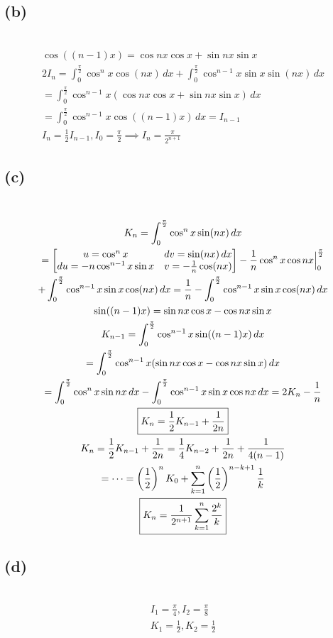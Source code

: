 \documentclass[12pt]{article}
\newcommand*{\paren}[1]{\ensuremath\left(#1\right)}
\newcommand{\subproblem}[1]{\subsection{(#1)} \,}
\begin{document}
\subproblem{b}
\begin{gather*}
    \cos ((n-1)x)=\cos nx \cos x +\sin nx\sin x\\
    2I_n=\int_0^{\frac{\pi}{2}} \cos^n x\cos (nx)\, dx + \int_0^\frac{\pi}{2} \cos ^{n-1}x\sin x \sin (nx)\, dx\\
    = \int_0^\frac{\pi}{2} \cos^{n-1}x(\cos nx \cos x +\sin nx\sin x)\, dx\\
    =\int_0^\frac{\pi}{2} \cos^{n-1}x\cos ((n-1)x)\, dx = I_{n-1}\\
    I_n = \frac{1}{2}I_{n-1}, I_0 = \frac{\pi}{2} \implies \boxed{I_n = \frac{\pi}{2^{n+1}}}
\end{gather*}

\subproblem{c}
\begin{gather*}
    K_n = \int_0^{\frac{\pi}{2}} \cos^n x \sin (nx)\, dx\\
    =\begin{bmatrix}
        u=\cos^n x & dv=\sin (nx)\, dx\\
        du=-n\cos^{n-1}x\sin x  & v=-\frac{1}{n}\cos (nx)
    \end{bmatrix} -\frac{1}{n}\cos^n x\cos nx\Big|^\frac{\pi}{2}_0 \\
    + \int_0^\frac{\pi}{2} \cos ^{n-1}x\sin x \cos (nx)\, dx = \frac{1}{n} - \int_0^\frac{\pi}{2} \cos ^{n-1}x\sin x \cos (nx)\, dx\\
    \sin((n-1)x) = \sin nx \cos x - \cos nx \sin x\\
    K_{n-1} = \int_0^{\frac{\pi}{2}} \cos^{n-1}x \sin((n-1)x)\, dx \\= \int_0^{\frac{\pi}{2}} \cos^{n-1}x (\sin nx \cos x - \cos nx \sin x)\, dx\\
    = \int_0^{\frac{\pi}{2}} \cos^n x \sin nx \, dx - \int_0^{\frac{\pi}{2}} \cos^{n-1} x \sin x \cos nx \, dx  = 2K_n - \frac{1}{n}\\
    \boxed{K_n = \frac{1}{2}K_{n-1} + \frac{1}{2n}}\\
    K_n = \frac{1}{2}K_{n-1} + \frac{1}{2n} = \frac{1}{4}K_{n-2} + \frac{1}{2n} + \frac{1}{4(n-1)}\\
    = \dots = \paren{\frac{1}{2}}^nK_0 + \sum_{k=1}^n \paren{\frac{1}{2}}^{n-k+1}\frac{1}{k}\\
    \boxed{K_n = \frac{1}{2^{n+1}}\sum_{k=1}^n \frac{2^k}{k}}
\end{gather*}

\subproblem{d}
\begin{gather*}
    I_1=\frac{\pi}{4}, I_2=\frac{\pi}{8}\\
    K_1=\frac{1}{2},K_2=\frac{1}{2}
\end{gather*}
\end{document}
